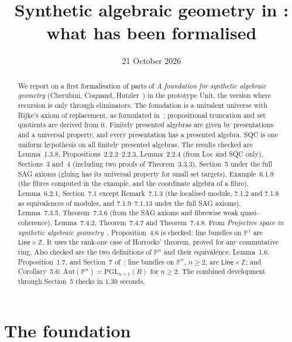 \documentclass[11pt]{article}
\title{Synthetic algebraic geometry in \sys:\\what has been formalised}
\author{}
\date{21 October 2026}
\newcommand{\sys}{\textsf{Unit}\xspace}
\newcommand{\PP}{\mathbb{P}^1}
\theoremstyle{remark}
\begin{document}
\maketitle

\begin{abstract}
\noindent
We report on a first formalisation of parts of \emph{A foundation for
synthetic algebraic geometry} (Cherubini, Coquand, Hutzler~\cite{SAG})
in the prototype \sys, the version where recursion is only through
eliminators. The foundation is a univalent universe with Rijke's axiom
of replacement, as formulated in~\cite{CavCoq}; propositional truncation
and set quotients are derived from it. Finitely presented algebras are
given by presentations and a universal property, and every presentation
has a presented algebra. SQC is one uniform hypothesis on all finitely
presented algebras. The results checked are Lemma~1.3.8,
Propositions~2.2.2--2.2.3, Lemma~2.2.4 (from Loc and SQC only),
Sections~3 and~4 (including
two proofs of Theorem~3.3.3), Section~5 under the full SAG
axioms (gluing has its universal property for small set targets),
Example~6.1.9 (the
fibres computed in the example, and the coordinate algebra of a fibre),
Lemma~6.2.1, Section~7.1 except Remark~7.1.3 (the localised module, 7.1.2 and 7.1.8 as
equivalences of modules, and 7.1.9--7.1.13 under the full SAG axioms),
Lemma~7.3.5, Theorem~7.3.6 (from the SAG axioms and fibrewise weak
quasi-coherence), Lemma~7.4.2, Theorem~7.4.7 and
Theorem~7.4.8. From \emph{Projective space in synthetic algebraic
geometry}~\cite{Proj}, Proposition~4.6 is checked: line bundles on
$\PP$ are $\mathsf{Line}\times\mathbb Z$. It uses the rank-one case of
Horrocks' theorem, proved for any commutative ring. Also checked are the
two definitions of $\mathbb P^n$ and their equivalence, Lemma~1.6,
Proposition~1.7, and Section~7 of~\cite{Proj}: line bundles on
$\mathbb P^n$, $n\ge 2$, are $\mathsf{Line}\times\mathbb Z$; and
Corollary~5.6: $\mathrm{Aut}(\mathbb P^n)=\mathrm{PGL}_{n+1}(R)$ for
$n\ge2$. The combined development through Section~5 checks in
$1.30$ seconds.
\end{abstract}

\section{The foundation}
\end{document}
